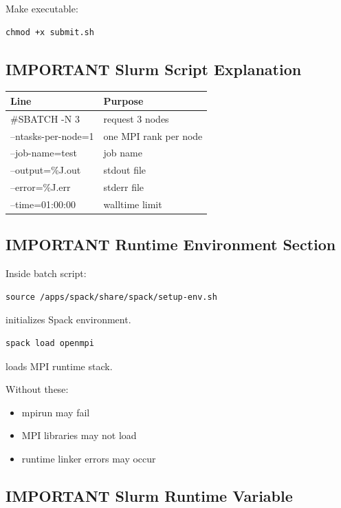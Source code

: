 \documentclass[11pt]{article}
\begin{document}
Make executable:

\begin{verbatim}
chmod +x submit.sh
\end{verbatim}
\subsection{IMPORTANT Slurm Script Explanation}
\label{sec:org6b9f258}

\begin{center}
\begin{tabular}{ll}
Line & Purpose\\
\hline
\#SBATCH -N 3 & request 3 nodes\\
--ntasks-per-node=1 & one MPI rank per node\\
--job-name=test & job name\\
--output=\%J.out & stdout file\\
--error=\%J.err & stderr file\\
--time=01:00:00 & walltime limit\\
\end{tabular}
\end{center}
\subsection{IMPORTANT Runtime Environment Section}
\label{sec:orgde7e8b7}

Inside batch script:

\begin{verbatim}
source /apps/spack/share/spack/setup-env.sh
\end{verbatim}

initializes Spack environment.

\begin{verbatim}
spack load openmpi
\end{verbatim}

loads MPI runtime stack.

Without these:

\begin{itemize}
\item mpirun may fail
\item MPI libraries may not load
\item runtime linker errors may occur
\end{itemize}
\subsection{IMPORTANT Slurm Runtime Variable}
\label{sec:orge57e648}
\end{document}
